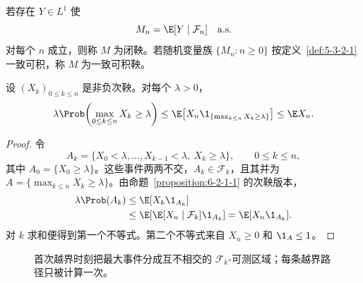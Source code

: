 \begin{definition}[闭鞅与一致可积鞅]\label{def:6-2-2-3}
若存在 $Y\in L^1$ 使
\[
  M_n=\E[Y\mid\mathcal F_n]\quad\text{a.s.}
\]
对每个 $n$ 成立，则称 $M$ 为闭鞅。若随机变量族
$\{M_n:n\ge0\}$ 按定义~\ref{def:5-3-2-1} 一致可积，称 $M$ 为一致可积鞅。
\end{definition}

\begin{theorem}\label{theorem:6-2-2-1}
设 $(X_k)_{0\le k\le n}$ 是非负次鞅。对每个 $\lambda>0$，
\begin{equation}\label{eq:6-2-doob-weak-one}
 \lambda\Prob\!\left(\max_{0\le k\le n}X_k\ge\lambda\right)
 \le \E\!\left[X_n\1_{\{\max_{k\le n}X_k\ge\lambda\}}\right]
 \le \E X_n.
\end{equation}
\end{theorem}

\begin{proof}
令
\[
 A_k=\{X_0<\lambda,\ldots,X_{k-1}<\lambda,\ X_k\ge\lambda\},
 \qquad 0\le k\le n,
\]
其中 $A_0=\{X_0\ge\lambda\}$。这些事件两两不交，$A_k\in\mathcal F_k$，且其并为
$A=\{\max_{k\le n}X_k\ge\lambda\}$。由命题~\ref{proposition:6-2-1-1} 的次鞅版本，
\begin{align*}
 \lambda\Prob(A_k)
 &\le \E[X_k\1_{A_k}]\\
 &\le \E\!\left[\E[X_n\mid\mathcal F_k]\1_{A_k}\right]
 =\E[X_n\1_{A_k}].
\end{align*}
对 $k$ 求和便得到第一个不等式。第二个不等式来自 $X_n\ge0$ 和
$\1_A\le1$。
\end{proof}

\begin{figure}[htbp]
\centering
{}
\caption{首次越界时刻把最大事件分成互不相交的 $\mathcal F_k$-可测区域；每条越界路径只被计算一次。}
\label{fig:6-2-2-first-crossing}
\end{figure}

